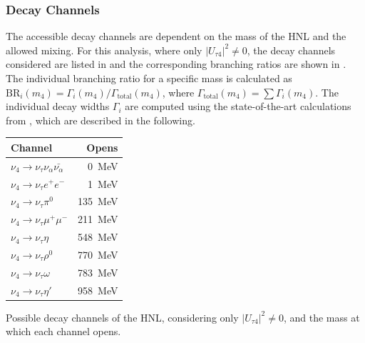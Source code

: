 \subsubsection{Decay Channels}

The accessible decay channels are dependent on the mass of the HNL and the allowed mixing. For this analysis, where only $|U_{\tau4}|^2 \neq 0$, the decay channels considered are listed in  and the corresponding branching ratios are shown in . The individual branching ratio for a specific mass is calculated as $\mathrm{BR}_i(m_4)=\Gamma_i(m_4)/\Gamma_\mathrm{total}(m_4)$, where $\Gamma_\mathrm{total}(m_4)=\sum\Gamma_i(m_4)$. The individual decay widths $\Gamma_i$ are computed using the state-of-the-art calculations from , which are described in the following.

\begin{margintable}
    \begin{tabular} { lr }
        \hline\hline 
        \textbf{Channel} & \textbf{Opens}  \\
        \hline\hline 
        $\nu_4 \rightarrow \nu_\tau \nu_\alpha \bar{\nu_\alpha}$ & \SI{0}{\MeV} \\
        $\nu_4 \rightarrow \nu_\tau e^+ e^-$ & \SI{1}{\MeV} \\
        $\nu_4 \rightarrow \nu_\tau \pi^0$ & \SI{135}{\MeV} \\
        $\nu_4 \rightarrow \nu_\tau \mu^+ \mu^-$ & \SI{211}{\MeV} \\
        $\nu_4 \rightarrow \nu_\tau \eta$ & \SI{548}{\MeV} \\
        $\nu_4 \rightarrow \nu_\tau \rho^0$ & \SI{770}{\MeV} \\
        $\nu_4 \rightarrow \nu_\tau \omega$ & \SI{783}{\MeV} \\
        $\nu_4 \rightarrow \nu_\tau \eta'$ & \SI{958}{\MeV} \\
        \hline
    \end{tabular}
    \caption[HNL mass dependent decay channels]{Possible decay channels of the HNL, considering only $|U_{\tau4}|^2 \neq 0$, and the mass at which each channel opens.}
\end{margintable}

